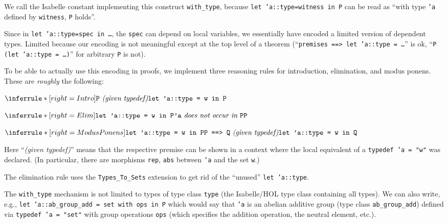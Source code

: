\documentclass[11pt,a4paper]{article}
\begin{document}
We call the Isabelle constant implementing this construct \texttt{with\_type}, because \texttt{let 'a::type=witness in P} can be read as ``with type \texttt{'a} defined by \texttt{witness}, \texttt{P} holds''.

Since in \texttt{let 'a::type=spec in \dots}, the \texttt{spec} can depend on local variables,
we essentially have encoded a limited version of dependent types.
Limited because our encoding is not meaningful except at the top level of a theorem (``\texttt{premises ==> let 'a::type = \dots}'' is ok, ``\texttt{P (let 'a::type = \dots)}'' for arbitrary \texttt{P} is not).

To be able to actually use this encoding in proofs, we implement three reasoning rules for introduction, elimination, and modus ponens.
These are \emph{roughly} the following:
\begin{center}
  $\inferrule*[right=Intro]{
    \texttt{P}\ \textit{(given typedef)}
  }{
    \texttt{let 'a::type = w in P}
  }$

  \medskip
  
  $\inferrule*[right=Elim]{
    \texttt{let 'a::type = w in P}
    \\
    \texttt{'a}\textit{ does not occur in }\texttt{P}
  }{
    \mathtt{P}
  }$

  \medskip
  
  $\inferrule*[right=ModusPonens]{
    \texttt{let 'a::type = w in P}
    \\
    \texttt{P ==> Q}\ \textit{(given typedef)}
  }{
    \texttt{let 'a::type = w in Q}
  }$
\end{center}
Here ``\textit{(given typedef)}'' means that the respective premise can be shown in a context where
the local equivalent of a \texttt{typedef 'a = "w"} was declared.
(In particular, there are morphisms \texttt{rep}, \texttt{abs} between \texttt{'a} and the set \texttt{w}.)

The elimination rule uses the \texttt{Types\_To\_Sets} extension \cite{types-to-sets} to get rid of the ``unused'' \texttt{let 'a::type}.

\bigskip

The \texttt{with\_type} mechanism is not limited to types of type class \texttt{type}
(the Isabelle/HOL type class containing all types).
We can also write, e.g., \texttt{let 'a::ab\_group\_add = set with ops in P} which would say that \texttt{'a} is an abelian additive group (type class \texttt{ab\_group\_add}) defined via \texttt{typedef 'a = "set"} with group operations \texttt{ops} (which specifies the addition operation, the neutral element, etc.).






\end{document}
